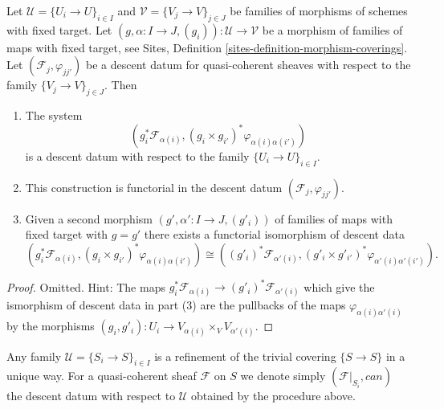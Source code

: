 \begin{lemma}
\label{lemma-refine-descent-datum}
Let $\mathcal{U} = \{U_i \to U\}_{i \in I}$ and
$\mathcal{V} = \{V_j \to V\}_{j \in J}$
be families of morphisms of schemes with fixed target.
Let $(g, \alpha : I \to J, (g_i)) : \mathcal{U} \to \mathcal{V}$
be a morphism of families of maps with fixed target, see
Sites, Definition \ref{sites-definition-morphism-coverings}.
Let $(\mathcal{F}_j, \varphi_{jj'})$ be a descent
datum for quasi-coherent sheaves with respect to the
family $\{V_j \to V\}_{j \in J}$. Then
\begin{enumerate}
\item The system
$$
\left(g_i^*\mathcal{F}_{\alpha(i)},
(g_i \times g_{i'})^*\varphi_{\alpha(i)\alpha(i')}\right)
$$
is a descent datum with respect to the family $\{U_i \to U\}_{i \in I}$.
\item This construction is functorial in the descent datum
$(\mathcal{F}_j, \varphi_{jj'})$.
\item Given a second morphism $(g', \alpha' : I \to J, (g'_i))$
of families of maps with fixed target with $g = g'$
there exists a functorial isomorphism of descent data
$$
(g_i^*\mathcal{F}_{\alpha(i)},
(g_i \times g_{i'})^*\varphi_{\alpha(i)\alpha(i')})
\cong
((g'_i)^*\mathcal{F}_{\alpha'(i)},
(g'_i \times g'_{i'})^*\varphi_{\alpha'(i)\alpha'(i')}).
$$
\end{enumerate}
\end{lemma}

\begin{proof}
Omitted. Hint: The maps
$g_i^*\mathcal{F}_{\alpha(i)} \to (g'_i)^*\mathcal{F}_{\alpha'(i)}$
which give the ismorphism of descent data in part (3)
are the pullbacks of the maps $\varphi_{\alpha(i)\alpha'(i)}$ by the
morphisms $(g_i, g'_i) : U_i \to V_{\alpha(i)} \times_V V_{\alpha'(i)}$.
\end{proof}

\noindent
Any family $\mathcal{U} = \{S_i \to S\}_{i \in I}$ is a refinement of
the trivial covering $\{S \to S\}$ in a unique way. For
a quasi-coherent sheaf $\mathcal{F}$ on $S$ we denote simply
$(\mathcal{F}|_{S_i}, can)$ the descent datum with respect to
$\mathcal{U}$ obtained by the procedure above.


